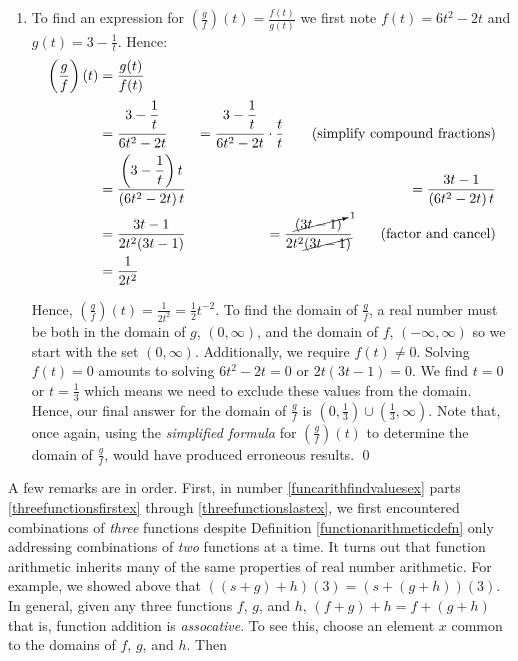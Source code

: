 \begin{ex}
\begin{enumerate}
\begin{enumerate}
\item To find an expression for $\left(\frac{g}{f}\right)(t) = \frac{f(t)}{g(t)}$ we first note $f(t) = 6t^2-2t$ and $g(t) = 3 - \frac{1}{t}$.  Hence:
\begin{align*}
	\left( \dfrac{g}{f}\right)(t) &= \dfrac{g(t)}{f(t)} \\
	& = \dfrac{3-\dfrac{1}{t}\vphantom{\left(\dfrac{1}{t}\right)}}{6t^2 - 2t} &= \dfrac{3-\dfrac{1}{t}\vphantom{\left(\dfrac{1}{t}\right)}}{6t^2 - 2t} \cdot \dfrac{t}{t} \tag{simplify compound fractions} \\
	& = \dfrac{\left(3-\dfrac{1}{t}\right) t}{\left(6t^2 - 2t\right)t} &=  \dfrac{3t-1}{\left(6t^2 - 2t\right)t} \\
	& = \dfrac{3t-1}{2t^2(3t-1)} &=  \dfrac{\cancelto{1}{(3t-1)}}{2t^2\cancel{(3t-1)}} \tag{factor and cancel} \\
& = \dfrac{1}{2t^2} \\
\end{align*}

Hence, $\left(\frac{g}{f} \right)(t) = \frac{1}{2t^2} = \frac{1}{2} t^{-2}$.  To find the domain of $\frac{g}{f}$, a real number must be both in the domain of $g$, $(0, \infty)$, and the domain of $f$, $(-\infty, \infty)$ so we start with the set $(0, \infty)$.  Additionally, we require $f(t) \neq 0$.  Solving $f(t) = 0$ amounts to solving $6t^2-2t = 0$ or $2t(3t-1) = 0$.  We find $t = 0$ or $t = \frac{1}{3}$ which means we need to exclude these values from the domain.  Hence, our final answer for the domain of $\frac{g}{f}$ is $\left(0, \frac{1}{3} \right) \cup \left(\frac{1}{3}, \infty \right)$.  Note that, once again,  using the  \textit{simplified formula} for $\left(\frac{g}{f}\right)(t)$ to determine the domain of $\frac{g}{f}$, would have produced erroneous results. \qed

\end{enumerate}

\end{enumerate}

\end{ex}
 
 A few remarks are in order.  First, in number \ref{funcarithfindvaluesex} parts \ref{threefunctionsfirstex} through \ref{threefunctionslastex}, we first encountered combinations of \textit{three} functions despite Definition \ref{functionarithmeticdefn} only addressing combinations of \textit{two} functions at a time.  It turns out that function arithmetic inherits many of the same properties of real number arithmetic. For example, we showed above that  $((s+g)+h)(3) = (s+(g+h))(3)$.  In general, given any three functions $f$, $g$, and $h$, $(f+g)+h = f +(g+h)$ that is, function addition is \textit{assocative}.  To see this, choose an element $x$ common to the domains of $f$, $g$, and $h$.  Then 
 
